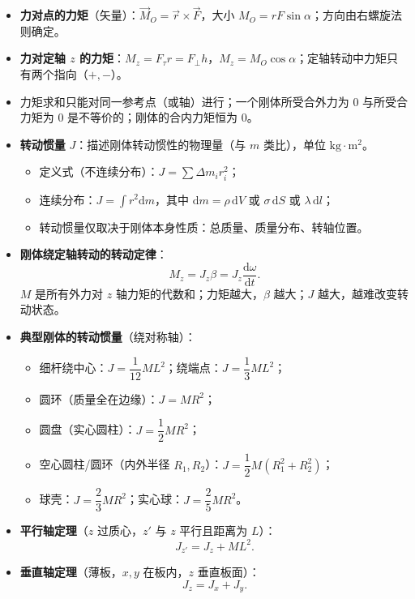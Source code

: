 \documentclass[12pt,a4paper]{ctexart}
\begin{document}
\begin{itemize}
    \item \textbf{力对点的力矩}（矢量）：$\vec{M}_O = \vec{r}\times\vec{F}$，大小 $M_O = rF\sin\alpha$；方向由右螺旋法则确定。
    \item \textbf{力对定轴 $z$ 的力矩}：$M_z = F_\tau r = F_\perp h$，$M_z = M_O\cos\alpha$；定轴转动中力矩只有两个指向（$+,-$）。
    \item 力矩求和只能对同一参考点（或轴）进行；一个刚体所受合外力为 0 与所受合力矩为 0 是不等价的；刚体的合内力矩恒为 0。
    \item \textbf{转动惯量} $J$：描述刚体转动惯性的物理量（与 $m$ 类比），单位 $\mathrm{kg\cdot m^2}$。
    \begin{itemize}
        \item 定义式（不连续分布）：$J = \sum \Delta m_i r_i^2$；
        \item 连续分布：$J = \int r^2 \mathrm{d}m$，其中 $\mathrm{d}m = \rho\,\mathrm{d}V$ 或 $\sigma\,\mathrm{d}S$ 或 $\lambda\,\mathrm{d}l$；
        \item 转动惯量仅取决于刚体本身性质：总质量、质量分布、转轴位置。
    \end{itemize}
    \item \textbf{刚体绕定轴转动的转动定律}：
    \[
        M_z = J_z\beta = J_z\frac{\mathrm{d}\omega}{\mathrm{d}t}.
    \]
    $M$ 是所有外力对 $z$ 轴力矩的代数和；力矩越大，$\beta$ 越大；$J$ 越大，越难改变转动状态。
    \item \textbf{典型刚体的转动惯量}（绕对称轴）：
    \begin{itemize}
        \item 细杆绕中心：$J = \dfrac{1}{12}ML^2$；绕端点：$J = \dfrac{1}{3}ML^2$；
        \item 圆环（质量全在边缘）：$J = MR^2$；
        \item 圆盘（实心圆柱）：$J = \dfrac{1}{2}MR^2$；
        \item 空心圆柱/圆环（内外半径 $R_1,R_2$）：$J = \dfrac{1}{2}M(R_1^2+R_2^2)$；
        \item 球壳：$J = \dfrac{2}{3}MR^2$；实心球：$J = \dfrac{2}{5}MR^2$。
    \end{itemize}
    \item \textbf{平行轴定理}（$z$ 过质心，$z'$ 与 $z$ 平行且距离为 $L$）：
    \[
        J_{z'} = J_z + ML^2.
    \]
    \item \textbf{垂直轴定理}（薄板，$x,y$ 在板内，$z$ 垂直板面）：
    \[
        J_z = J_x + J_y.
    \]
\end{itemize}
\end{document}
